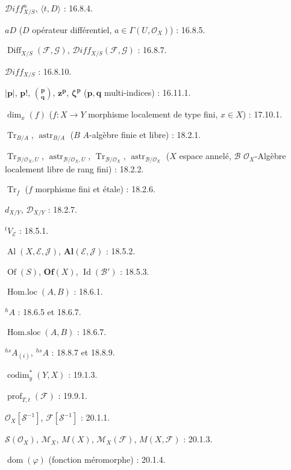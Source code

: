 $\mathcal{D}iff^{n}_{X/S}$, $\langle t,D\rangle$ : 16.8.4.

$aD$ ($D$ opérateur différentiel, $a\in\Gamma(U,\mathcal{O}_X)$) : 16.8.5.

$\operatorname{Diff}_{X/S}(\mathcal{F},\mathcal{G})$,
$\mathcal{D}iff_{X/S}(\mathcal{F},\mathcal{G})$ : 16.8.7.

$\mathcal{D}iff_{X/S}$ : 16.8.10.

$|\mathbf p|$, $\mathbf p!$, $\binom{\mathbf p}{\mathbf q}$,
$\mathbf z^{\mathbf p}$, $\boldsymbol\zeta^{\mathbf p}$
($\mathbf p,\mathbf q$ multi-indices) : 16.11.1.

$\dim_x(f)$ ($f:X\to Y$ morphisme localement de type fini, $x\in X$) : 17.10.1.

$\operatorname{Tr}_{B/A}$, $\operatorname{astr}_{B/A}$
($B$ $A$-algèbre finie et libre) : 18.2.1.

$\operatorname{Tr}_{\mathcal B/\mathcal O_X,U}$,
$\operatorname{astr}_{\mathcal B/\mathcal O_X,U}$,
$\operatorname{Tr}_{\mathcal B/\mathcal O_X}$,
$\operatorname{astr}_{\mathcal B/\mathcal O_X}$
($X$ espace annelé, $\mathcal B$ $\mathcal O_X$-Algèbre localement libre de rang fini) : 18.2.2.

$\operatorname{Tr}_f$ ($f$ morphisme fini et étale) : 18.2.6.

$d_{X/Y}$, $\mathcal D_{X/Y}$ : 18.2.7.

${}^{t}V_{\mathcal E}$ : 18.5.1.

$\operatorname{Al}(X,\mathcal E,\mathcal J)$, $\mathbf{Al}(\mathcal E,\mathcal J)$ : 18.5.2.

$\operatorname{Of}(S)$, $\mathbf{Of}(X)$, $\operatorname{Id}(\mathcal B')$ : 18.5.3.

$\operatorname{Hom.loc}(A,B)$ : 18.6.1.

${}^{h}A$ : 18.6.5 et 18.6.7.

$\operatorname{Hom.sloc}(A,B)$ : 18.6.7.

${}^{hs}A_{(i)}$, ${}^{hs}A$ : 18.8.7 et 18.8.9.

$\operatorname{codim}^{*}_{y}(Y,X)$ : 19.1.3.

$\operatorname{prof}_{T,t}(\mathcal F)$ : 19.9.1.

$\mathcal O_X[\mathcal S^{-1}]$, $\mathcal F[\mathcal S^{-1}]$ : 20.1.1.

$\mathcal S(\mathcal O_X)$, $\mathcal M_X$, $M(X)$,
$\mathcal M_X(\mathcal F)$, $M(X,\mathcal F)$ : 20.1.3.

$\operatorname{dom}(\varphi)$ (fonction méromorphe) : 20.1.4.

